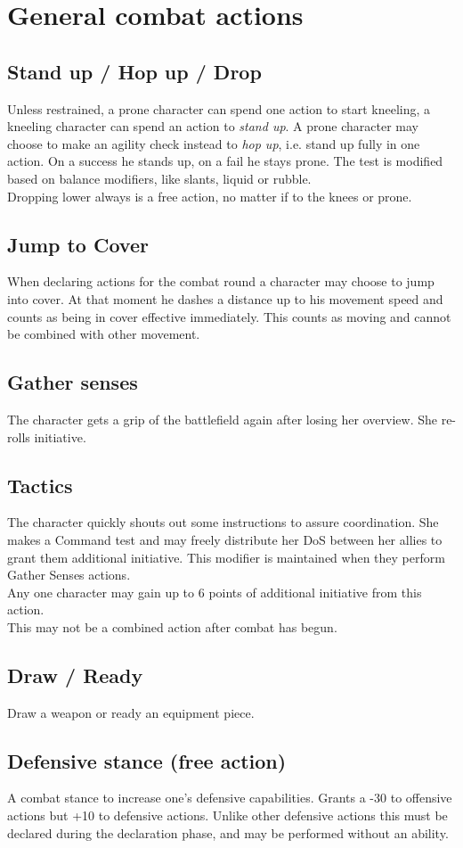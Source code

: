 \section{General combat actions}
\subsection*{Stand up / Hop up / Drop}
Unless restrained, a prone character can spend one action to start kneeling, a kneeling character can spend an action to \emph{stand up}. A prone character may choose to make an agility check instead to \emph{hop up}, i.e. stand up fully in one action. On a success he stands up, on a fail he stays prone. The test is modified based on balance modifiers, like slants, liquid or rubble.\\
Dropping lower always is a free action, no matter if to the knees or prone.
\subsection*{Jump to Cover}
When declaring actions for the combat round a character may choose to jump into cover.
At that moment he dashes a distance up to his movement speed
	and counts as being in cover effective immediately.
This counts as moving and cannot be combined with other movement.
\subsection*{Gather senses}
The character gets a grip of the battlefield again after losing her overview. She re-rolls initiative.
\subsection*{Tactics}
The character quickly shouts out some instructions to assure coordination.
She makes a Command test and may freely distribute her DoS between her allies to grant them additional initiative.
This modifier is maintained when they perform Gather Senses actions.\\
Any one character may gain up to 6 points of additional initiative from this action.
\\%
This may not be a combined action after combat has begun.
\subsection*{Draw / Ready}
Draw a weapon or ready an equipment piece.
\subsection*{Defensive stance (free action)}
A combat stance to increase one’s defensive capabilities.
Grants a -30 to offensive actions but +10 to defensive actions.
Unlike other defensive actions this must be declared during the declaration phase,
	and may be performed without an ability.
